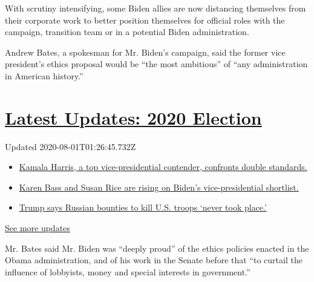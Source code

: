 With scrutiny intensifying, some Biden allies are now distancing
themselves from their corporate work to better position themselves for
official roles with the campaign, transition team or in a potential
Biden administration.

Andrew Bates, a spokesman for Mr. Biden's campaign, said the former vice
president's ethics proposal would be ``the most ambitious'' of ``any
administration in American history.''

\hypertarget{latest-updates-2020-election}{%
\section{\texorpdfstring{\href{https://www.nytimes.com/2020/07/31/us/elections/biden-vs-trump.html?action=click\&pgtype=Article\&state=default\&region=MAIN_CONTENT_1\&context=storylines_live_updates}{Latest
Updates: 2020
Election}}{Latest Updates: 2020 Election}}\label{latest-updates-2020-election}}

Updated 2020-08-01T01:26:45.732Z

\begin{itemize}
\tightlist
\item
  \href{https://www.nytimes.com/2020/07/31/us/elections/biden-vs-trump.html?action=click\&pgtype=Article\&state=default\&region=MAIN_CONTENT_1\&context=storylines_live_updates\#link-29fdff45}{Kamala
  Harris, a top vice-presidential contender, confronts double
  standards.}
\item
  \href{https://www.nytimes.com/2020/07/31/us/elections/biden-vs-trump.html?action=click\&pgtype=Article\&state=default\&region=MAIN_CONTENT_1\&context=storylines_live_updates\#link-13ec3d9c}{Karen
  Bass and Susan Rice are rising on Biden's vice-presidential
  shortlist.}
\item
  \href{https://www.nytimes.com/2020/07/31/us/elections/biden-vs-trump.html?action=click\&pgtype=Article\&state=default\&region=MAIN_CONTENT_1\&context=storylines_live_updates\#link-49e9a016}{Trump
  says Russian bounties to kill U.S. troops `never took place.'}
\end{itemize}

\href{https://www.nytimes.com/2020/07/31/us/elections/biden-vs-trump.html?action=click\&pgtype=Article\&state=default\&region=MAIN_CONTENT_1\&context=storylines_live_updates}{See
more updates}

Mr. Bates said Mr. Biden was ``deeply proud'' of the ethics policies
enacted in the Obama administration, and of his work in the Senate
before that ``to curtail the influence of lobbyists, money and special
interests in government.''

